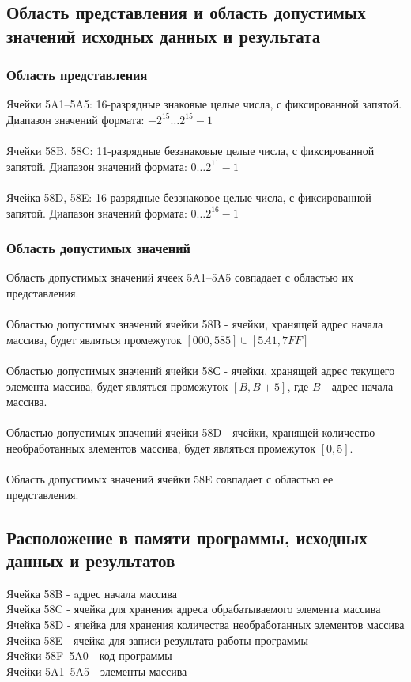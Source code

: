 \subsection{Область представления и область допустимых значений исходных данных и результата}
\subsubsection{Область представления}
\noindent Ячейки 5A1--5A5: 16-разрядные знаковые целые числа, с фиксированной запятой. Диапазон значений формата: $-2^{15}\ldots2^{15}-1$\\
\\
Ячейки 58B, 58C: 11-разрядные беззнаковые целые числа, с фиксированной запятой. Диапазон значений формата: $0\ldots2^{11} - 1$\\
\\
Ячейка 58D, 58E: 16-разрядные беззнаковое целые числа, с фиксированной запятой. Диапазон значений формата: $0\ldots2^{16} - 1$\\


\subsubsection{Область допустимых значений}
\noindent Область допустимых значений ячеек 5A1--5A5 совпадает с областью их представления.\\
\\
Областью допустимых значений ячейки 58B - ячейки, хранящей адрес начала массива, будет являться промежуток $[000, 585]\cup[5A1,7FF]$\\
\\
Областью допустимых значений ячейки 58С - ячейки, хранящей адрес текущего элемента массива, будет являться промежуток $ [B, B + 5] $, где $B$ - адрес начала массива.\\
\\
Областью допустимых значений ячейки 58D - ячейки, хранящей количество необработанных элементов массива, будет являться промежуток $ [0, 5] $.\\
\\
Область допустимых значений ячейки 58E совпадает с областью ее представления.\\

\subsection{Расположение в памяти программы, исходных данных и результатов}
\noindent 	Ячейка 58B - aдрес начала массива\\
Ячейка 58C - ячейка для хранения адреса обрабатываемого элемента массива\\
Ячейка 58D - ячейка для хранения количества необработанных элементов массива\\
Ячейка 58E - ячейка для записи результата работы программы\\
Ячейки 58F--5A0 - код программы\\
Ячейки 5A1--5A5 - элементы массива

